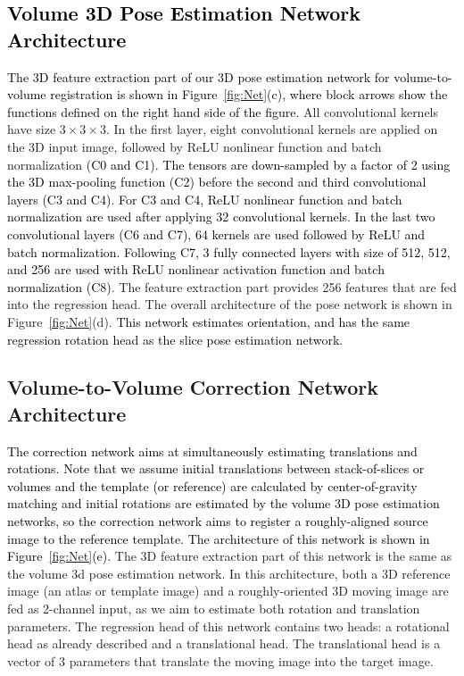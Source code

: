 \documentclass[journal,transmag]{IEEEtran}
\begin{document}
\subsection{\textcolor{black}{Volume 3D Pose Estimation Network Architecture}}
\textcolor{black}{
The 3D feature extraction part of our 3D pose estimation network for volume-to-volume registration is shown in Figure~\ref{fig:Net}(c), where block arrows show the functions defined on the right hand side of the figure.} All convolutional kernels have size $3 \times 3 \times 3$. In the first layer, eight convolutional kernels are applied on the 3D input image, followed by ReLU nonlinear function and batch normalization \textcolor{black}{(C0 and C1). The tensors are down-sampled by a factor \textcolor{black}{of} 2 using the 3D max-pooling function (C2) before the second and third convolutional layers (C3 and C4). For C3 and C4, ReLU nonlinear function and batch normalization are used after applying 32 convolutional kernels. In the last two convolutional layers (C6 and C7), 64 kernels are used followed by ReLU and batch normalization. Following C7, 3 fully connected layers with size of 512, 512, and 256 are used with ReLU nonlinear \textcolor{black}{activation} function and batch normalization (C8)}. The feature extraction part provides 256 features that are fed into the regression head. The overall architecture of the pose network is shown in Figure~\ref{fig:Net}(d). \textcolor{black}{This network estimates orientation, and has the same regression rotation head as the slice pose estimation network.}

\subsection{Volume-to-Volume Correction Network Architecture}
\textcolor{black}{The correction network aims at simultaneously estimating translations and rotations.} \textcolor{black}{Note that we assume initial translations between stack-of-slices or volumes and the template (or reference) are calculated by center-of-gravity matching and initial rotations are estimated by the volume 3D pose estimation networks, so the correction network aims to register a roughly-aligned source image to the reference template. The architecture of this network is shown in Figure~\ref{fig:Net}(e).} The 3D feature extraction part of this network is the same as the volume 3d pose estimation network. In this architecture, both a 3D reference image (an atlas or template image) and a roughly-oriented 3D moving image are fed as 2-channel input, as we aim to estimate both rotation and translation parameters. The regression head of this network contains two heads: a rotational head as already described and a translational head. The translational head is a vector of 3 parameters that translate the moving image into the target image.
\end{document}
